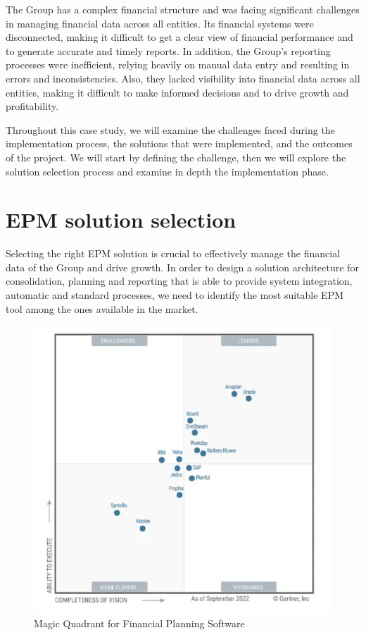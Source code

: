 \documentclass[12pt,a4paper,openright,twoside]{book}
\begin{document}
The Group has a complex financial structure and was facing significant challenges in managing financial data across all entities. 
%
Its financial systems were disconnected, making it difficult to get a clear view of financial performance and to generate accurate and timely reports. 
%
In addition, the Group's reporting processes were inefficient, relying heavily on manual data entry and resulting in errors and inconsistencies. 
%
Also, they lacked visibility into financial data across all entities, making it difficult to make informed decisions and to drive growth and profitability.

Throughout this case study, we will examine the challenges faced during the implementation process, the solutions that were implemented, and the outcomes of the project.
%
We will start by defining the challenge, then we will explore the solution selection process and examine in depth the implementation phase.

\section{EPM solution selection}

Selecting the right EPM solution is crucial to effectively manage the financial data of the Group and drive growth.
%
In order to design a solution architecture for consolidation, planning and reporting that is able to provide system integration, automatic and standard processes, we need to identify the most suitable EPM tool among the ones available in the market.

\begin{figure}[htbp]
	\centering
	\includegraphics[width=\linewidth]{figures/gartner.pdf}
	\caption{Magic Quadrant for Financial Planning Software}
	\label{fig:gartner}
\end{figure}
\end{document}
